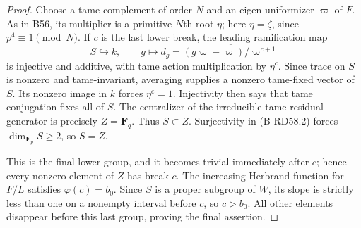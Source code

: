 \begin{proof}
Choose a tame complement of order $N$ and an eigen-uniformizer
$\varpi$ of $F$. As in B56, its multiplier is a primitive $N$th
root $\eta$; here $\eta=\zeta$, since $p^4\equiv1\pmod N$.
If $c$ is the last lower break, the leading ramification map
\[
 S\hookrightarrow k,\qquad
 g\longmapsto d_g=
    \overline{(g\varpi-\varpi)/\varpi^{c+1}}
\]
is injective and additive, with tame action multiplication by
$\eta^c$. Since trace on $S$ is nonzero and tame-invariant,
averaging supplies a nonzero tame-fixed vector of $S$.
Its nonzero image in $k$ forces $\eta^c=1$.
Injectivity then says that tame conjugation fixes all of $S$.
The centralizer of the irreducible tame residual generator is
precisely $Z=\mathbf F_q$. Thus $S\subset Z$.
Surjectivity in (B-RD58.2) forces $\dim_{\mathbf F_p}S\ge2$,
so $S=Z$.

This is the final lower group, and it becomes trivial immediately
after $c$; hence every nonzero element of $Z$ has break $c$.
The increasing Herbrand function for $F/L$ satisfies
$\varphi(c)=b_0$. Since $S$ is a proper subgroup of $W$,
its slope is strictly less than one on a nonempty interval before
$c$, so $c>b_0$. All other elements disappear before this last
group, proving the final assertion.
\end{proof}

